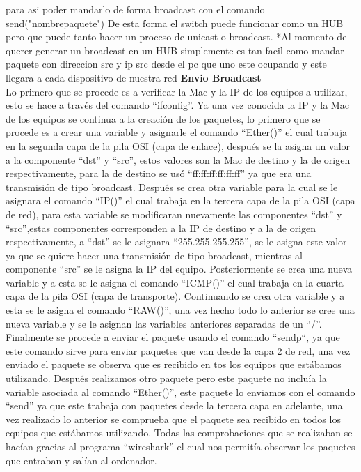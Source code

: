 \documentclass{udpreport}
\begin{document}
		para asi poder mandarlo de forma broadcast con el comando send("nombrepaquete")
		De esta forma el switch puede funcionar como un HUB pero que puede tanto hacer un proceso
		de unicast o broadcast.
		*Al momento de querer generar un broadcast en un HUB simplemente es tan facil como mandar
		paquete con direccion src y ip src desde el pc que uno este ocupando y este llegara a cada
		dispositivo de nuestra red
		{\bf Envio Broadcast}\\
		Lo primero que se procede es a verificar la Mac y la IP de los  equipos a utilizar, esto se hace a través del comando “ifconfig”. Ya una vez conocida la IP y la Mac de los equipos se continua a la creación de los paquetes, lo primero que se procede es a crear una variable y asignarle el comando  “Ether()” el cual trabaja en la segunda capa de la pila OSI (capa de enlace), después se la asigna un valor a la componente “dst” y “src”, estos valores son la Mac de destino y la de origen respectivamente, para la de destino se usó “ff:ff:ff:ff:ff:ff” ya que era una transmisión de tipo broadcast. Después se crea otra variable para la cual se le asignara el comando “IP()” el cual trabaja en la tercera capa de la pila OSI (capa de red), para esta variable se modificaran nuevamente las componentes “dst” y “src”,estas componentes corresponden a la IP de destino y a la de origen respectivamente, a “dst” se le asignara “255.255.255.255”, se le asigna este valor ya que se quiere hacer una transmisión de tipo broadcast, mientras al componente “src” se le asigna la IP del equipo. Posteriormente se crea una nueva variable y a esta se le asigna el comando “ICMP()” el cual trabaja en la cuarta capa de la pila OSI (capa de transporte). Continuando se crea otra variable y a esta se le asigna el comando “RAW()”, una vez hecho todo lo anterior se cree una nueva variable y se le asignan las variables anteriores separadas de un “/”. Finalmente se procede a enviar el paquete usando el comando “sendp“, ya que este comando sirve para enviar paquetes que van desde la capa 2 de red, una vez enviado el paquete se observa que es recibido en tos los equipos que estábamos utilizando. Después realizamos otro paquete pero este paquete no incluía la variable asociada al comando “Ether()”, este paquete lo enviamos con el comando “send” ya que este trabaja con paquetes desde la tercera capa en adelante, una vez realizado lo anterior se comprueba que el paquete sea recibido en todos los equipos que estábamos utilizando. Todas las comprobaciones que se realizaban se hacían gracias al programa “wireshark” el cual nos permitía observar los paquetes que entraban y salían al ordenador.\\
\end{document}

